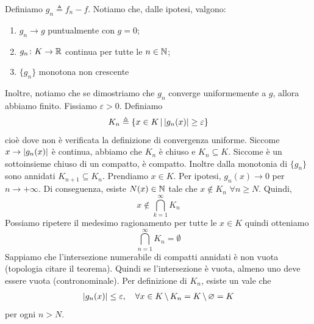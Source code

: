 \documentclass[a4paper]{article}
\begin{document}
\begin{snippetproof}{}
    Definiamo \(g_n \triangleq f_n - f\).
    Notiamo che, dalle ipotesi, valgono:
    \begin{enumerate}
        \item \(g_n \to g\) puntualmente con \(g=0\);
        \item \(g_n \colon K \to \mathbb{R}\) continua per tutte le \(n\in\mathbb{N}\);
        \item \(\{g_n\}\) monotona non crescente
    \end{enumerate}
    Inoltre, notiamo che se dimostriamo che \(g_n\) converge uniformemente a \(g\), allora abbiamo finito.
    Fissiamo \(\varepsilon>0\). Definiamo
    \[
        K_n \triangleq \left\{
            x \in K \,|\, |g_n(x)| \geq \varepsilon
        \right\}
    \]
    cioè dove non è verificata la definizione di convergenza uniforme.
    Siccome \(x \to |g_n(x)|\) è continua, abbiamo che \(K_n\) è chiuso e \(K_n \subseteq K\).
    Siccome è un sottoinsieme chiuso di un compatto, è compatto. Inoltre dalla monotonia di
    \(\{g_n\}\) sono annidati \(K_{n+1} \subseteq K_n\).
    Prendiamo \(x \in K\). Per ipotesi, \(g_n(x) \to 0\) per \(n \to +\infty\).
    Di conseguenza, esiste \(N(x) \in \mathbb{N}\) tale che \(x \notin K_n\)
    \(\forall n \geq N\).
    Quindi, \[ x \notin \bigcap_{k=1}^\infty K_n \]
    Possiamo ripetere il medesimo ragionamento per tutte le \(x \in K\) quindi otteniamo
    \[
        \bigcap_{n=1}^\infty K_n = \emptyset
    \]
    Sappiamo che l'intersezione numerabile di compatti annidati è non vuota (topologia citare il teorema).
    Quindi se l'intersezione è vuota, almeno uno deve essere vuota (contronominale).
    Per definizione di \(K_n\), esiste un vale che
    \begin{align*}
        |g_n(x)| \leq \varepsilon, \quad \forall x \in K \,\backslash\, K_n = K \,\backslash\, \varnothing = K
    \end{align*}
    per ogni \(n > N\).
\end{snippetproof}
\end{document}
